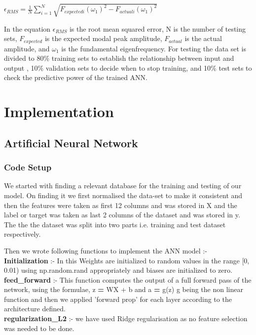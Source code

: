 \documentclass{article}
\begin{document}
\begin{center}
    $\epsilon_{RMS}=\frac{1}{N}{\sum_{i=1}^{N}\sqrt{{F_{expectedi}(\omega_{1})^{2}-F_{actuali}(\omega_{1})^{2}}}}$
\end{center}

In the equation $\epsilon_{RMS}$ is the root mean squared error, N is the number of testing sets, $F_{expected}$ is the expected modal peak amplitude, $F_{actual}$ is the actual amplitude, and $\omega_{1}$ is the fundamental eigenfrequency. For testing the data set is divided to 80\% training sets to establish the relationship between input and output , 10\% validation sets to decide when to stop training, and 10\% test sets to check the predictive power of the trained ANN.

\section{Implementation}
\subsection{Artificial Neural Network}
\subsubsection{Code Setup}
We started with finding a relevant database for the training and testing of our model. On finding it we first normalised the data-set to make it consistent and then the features were taken as first 12 columns and was stored in X and the label or target was taken as last 2 columns of the dataset and was stored in y. The the the dataset was split into two parts i.e. training and test dataset respectively.

Then we wrote following functions to implement the ANN model :-
\\\textbf{Initialization} :- In this Weights are initialized to random values in the range [0, 0.01) using np.random.rand appropriately and biases are initialized to zero.
\\\textbf{feed\_forward} :- This function computes the output of a full forward pass of the network, using the formulae, z \textbf{=} WX + b and a \textbf{=} g(z)  {g being the non linear function} and then we applied 'forward prop' for each layer according to the architecture defined. 
\\\textbf{regularization\_L2} :- we have used Ridge regularisation as no feature selection was needed to be done.
\end{document}
